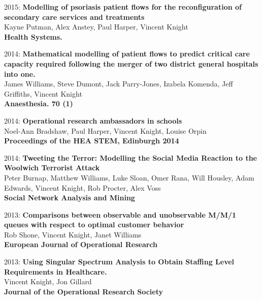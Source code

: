 \documentclass[10pt]{res} %
\begin{document}
\begin{resume}
\begin{etaremune}
\item
2015: \textbf{Modelling of psoriasis patient flows for the reconfiguration of secondary care services and treatments}\\
Kayne Putman, Alex Anstey, Paul Harper, Vincent Knight
\\
\textbf{Health Systems.}
\\

\item
2014: \textbf{Mathematical modelling of patient flows to predict critical care capacity required following the merger of two district general hospitals into one.}\\
James Williams, Steve Dumont, Jack Parry-Jones, Izabela Komenda, Jeff Griffiths, Vincent Knight
\\
\textbf{Anaesthesia. 70 (1)}
\\

\item
2014: \textbf{Operational research ambassadors in schools}\\
Noel-Ann Bradshaw, Paul Harper, Vincent Knight, Louise Orpin
\\
\textbf{Proceedings of the HEA STEM, Edinburgh 2014}
\\

\item
2014: \textbf{Tweeting the Terror: Modelling the Social Media Reaction to the Woolwich Terrorist Attack}\\
Peter Burnap, Matthew Williams, Luke Sloan, Omer Rana, Will Housley, Adam Edwards, Vincent Knight, Rob Procter, Alex Voss
\\
\textbf{Social Network Analysis and Mining}
\\

\item
2013: \textbf{Comparisons between observable and unobservable M/M/1 queues with respect to optimal customer behavior}\\
Rob Shone, Vincent Knight, Janet Williams
\\
\textbf{European Journal of Operational Research}
\\

\item
2013: \textbf{Using Singular Spectrum Analysis to Obtain Staffing Level Requirements in Healthcare.}\\
Vincent Knight, Jon Gillard
\\
\textbf{Journal of the Operational Research Society}
\\


\end{etaremune}
\end{resume}
\end{document}
